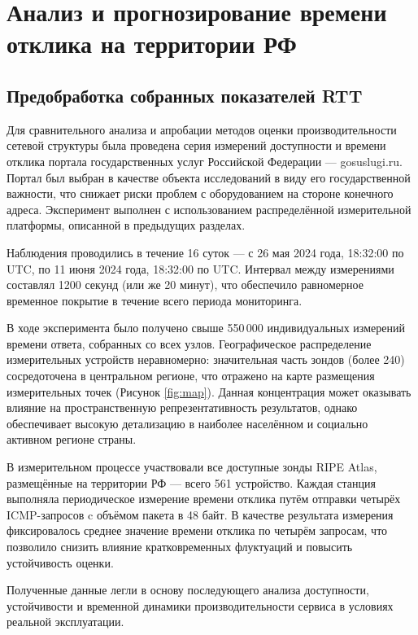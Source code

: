 \chapter{Анализ и прогнозирование времени отклика на территории РФ}\label{ch:ch4}

\section{Предобработка собранных показателей RTT}\label{sec:ch4/sect1}

Для сравнительного анализа и апробации методов оценки производительности сетевой структуры была проведена серия измерений доступности и времени отклика портала государственных услуг Российской Федерации — gosuslugi.ru. Портал был выбран в качестве объекта исследований в виду его государственной важности, что снижает риски проблем с оборудованием на стороне конечного адреса. Эксперимент выполнен с использованием распределённой измерительной платформы, описанной в предыдущих разделах.

Наблюдения проводились в течение 16 суток — с 26 мая 2024 года, 18:32:00 по UTC, по 11 июня 2024 года, 18:32:00 по UTC. Интервал между измерениями составлял 1200 секунд (или же 20 минут), что обеспечило равномерное временное покрытие в течение всего периода мониторинга.

В ходе эксперимента было получено свыше 550 000 индивидуальных измерений времени ответа, собранных со всех узлов. Географическое распределение измерительных устройств неравномерно: значительная часть зондов (более 240) сосредоточена в центральном регионе, что отражено на карте размещения измерительных точек (Рисунок \ref{fig:map}). Данная концентрация может оказывать влияние на пространственную репрезентативность результатов, \phantom{ }однако \phantom{ } обеспечивает высокую детализацию в наиболее населённом и социально активном регионе страны.

В измерительном процессе участвовали все доступные зонды RIPE Atlas, размещённые на территории РФ — всего 561 устройство. Каждая станция выполняла периодическое измерение времени отклика путём отправки четырёх ICMP-запросов c объёмом пакета в 48 байт. В качестве результата измерения фиксировалось среднее значение времени отклика по четырём запросам, что позволило снизить влияние кратковременных флуктуаций и повысить устойчивость оценки.

Полученные данные легли в основу последующего анализа доступности, устойчивости и временной динамики производительности сервиса в условиях реальной эксплуатации.



